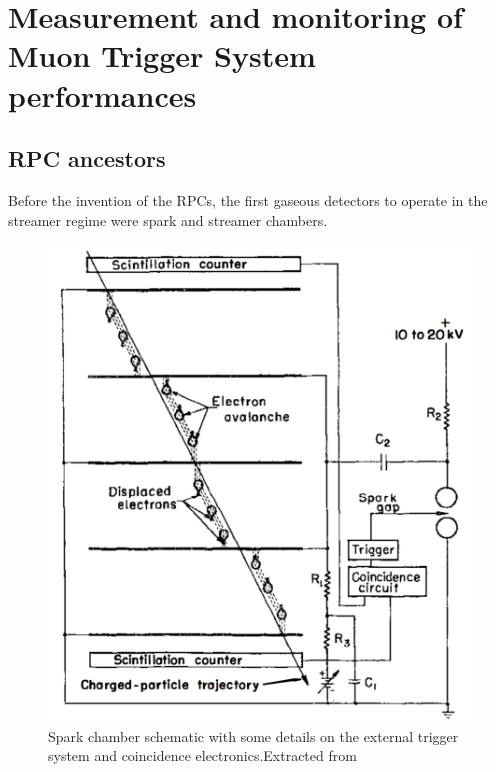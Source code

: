 \chapter{Measurement and monitoring of Muon Trigger System performances}

\section{RPC ancestors}
Before the invention of the RPCs, the first gaseous detectors to operate in the streamer regime were spark and streamer chambers.

\begin{figure}[!t]
\begin{center}
\includegraphics[width=0.95\linewidth]{Chapters/Performance/Figs/spark-chambers.pdf}
\caption{Spark chamber schematic with some details on the external trigger system and coincidence electronics.Extracted from \cite{wenzel:1966}}
\label{fig:SparkChamber}
\end{center}
\end{figure}

